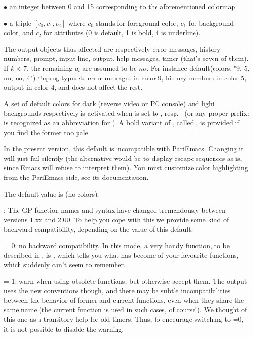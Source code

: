 \noindent $\bullet$ an integer between 0 and 15 corresponding to the
aforementioned colormap

\noindent $\bullet$ a triple $[c_0,c_1,c_2]$ where $c_0$ stands for foreground
color, $c_1$ for background color, and $c_2$ for attributes (0 is default, 1
is bold, 4 is underline).

The output objects thus affected are respectively error messages,
history numbers, prompt, input line, output, help messages, timer (that's
seven of them). If $k < 7$, the remaining $a_i$ are assumed to be $no$. For
instance
%
\bprog
default(colors, "9, 5, no, no, 4")
@eprog
\noindent
typesets error messages in color $9$, history numbers in color $5$, output in
color $4$, and does not affect the rest.

A set of default colors for dark (reverse video or PC console) and light
backgrounds respectively is activated when  is set to
, resp.~ (or any proper prefix:  is
recognized as an abbreviation for ). A bold variant of
, called , is provided if you find the former too
pale.

\emacs In the present version, this default is incompatible with PariEmacs.
Changing it will just fail silently (the alternative would be to display
escape sequences as is, since Emacs will refuse to interpret them).
You must customize color highlighting from the PariEmacs side, see its
documentation.

The default value is  (no colors).

: \label{se:def,compatible}The GP function names and syntax
have changed tremendously between versions 1.xx and 2.00. To help you cope
with this we provide some kind of backward compatibility, depending on the
value of this default:

\quad {} = 0: no backward compatibility. In this mode, a very
handy function, to be described in , is ,
which tells you what has become of your favourite functions, which 
suddenly can't seem to remember.

\quad {} = 1: warn when using obsolete functions, but
otherwise accept them. The output uses the new conventions though, and
there may be subtle incompatibilities between the behavior of former and
current functions, even when they share the same name (the current function
is used in such cases, of course!). We thought of this one as a transitory
help for  old-timers. Thus, to encourage switching to =0,
it is not possible to disable the warning.

